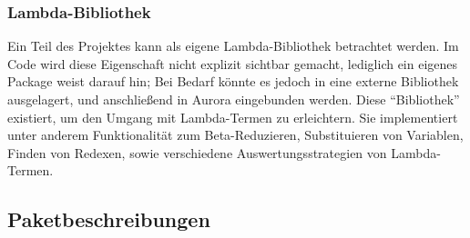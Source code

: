 \documentclass[parskip=full,11pt,twoside]{scrbook}
\begin{document}
\subsubsection{Lambda-Bibliothek}
Ein Teil des Projektes kann als eigene Lambda-Bibliothek betrachtet werden.
Im Code wird diese Eigenschaft nicht explizit sichtbar gemacht, lediglich ein eigenes Package weist darauf hin;
Bei Bedarf könnte es jedoch in eine externe Bibliothek ausgelagert, und anschließend in Aurora eingebunden werden.
Diese \enquote{Bibliothek} existiert, um den Umgang mit Lambda-Termen zu erleichtern.
Sie implementiert unter anderem Funktionalität zum Beta-Reduzieren, Substituieren von Variablen, Finden von Redexen, sowie verschiedene Auswertungsstrategien von Lambda-Termen.

\subsection{Paketbeschreibungen}
\end{document}
